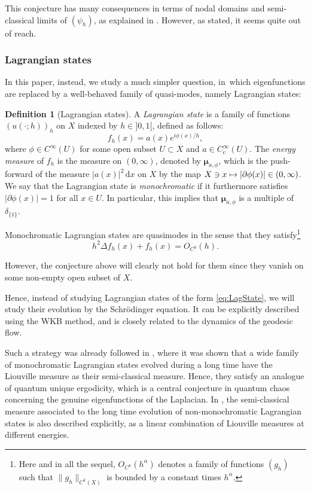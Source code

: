 \documentclass[JEP,XML,SOM,Unicode,published]{cedram}
\newcommand\mto{\mathchoice{\longmapsto}{\mapsto}{\mapsto}{\mapsto}}
\newcommand{\rc}{\mathrm{c}}
\newcommand{\rd}{\,\mathrm{d}}
\theoremstyle{plain}
\theoremstyle{definition}
\newtheorem{definition}[theorem]{Definition}
\begin{document}
This conjecture has many consequences in terms of nodal domains and semi-classical limits of $(\psi_h)$, as explained in \cite{LWL}. However, as stated, it seems quite out of reach.

\subsubsection*{Lagrangian states}

In this paper, instead, we study a much simpler question, in~which eigenfunctions are replaced by a well-behaved family of quasi-modes, namely Lagrangian states:

\begin{definition}[Lagrangian states]\label{def:LagStat}
A \emph{Lagrangian state} is a family of functions $(u(\cdot;h))_h$ on $X$ indexed by $h\in{}]0,1[$, defined as follows:\vspace{-3pt}
\begin{equation}\label{eq:LagState}
f_h(x)=a(x)e^{i\phi(x)/h},
\end{equation}
where $\phi\in C^\infty(U)$ for some open subset $U\subset X$ and $a\in C_\rc^\infty(U)$. The \emph{energy measure} of $f_h$ is the measure on $(0,\infty)$, denoted by $\boldsymbol{\mu}_{a,\phi}$, which is the push-forward of the measure $|a(x)|^2 \rd x$ on $X$ by the map $X\ni x \mto |\partial\phi(x)|\in (0,\infty)$. We say that the Lagrangian state is \emph{monochromatic} if it furthermore satisfies $|\partial \phi(x)|=1$ for all $x\in U$. In particular, this implies that $\boldsymbol{\mu}_{a,\phi}$ is a multiple of $\delta_{\{1\}}$.
\end{definition}

Monochromatic Lagrangian states are quasimodes in the sense that they satisfy\footnote{Here and in all the sequel, $O_{C^k}(h^\alpha)$ denotes a family of functions $(g_h)$ such that $\|g_h\|_{C^k(X)}$ is bounded by a constant times $h^\alpha$.}\vspace{-3pt}
\[
h^2\Delta f_h(x)+f_h(x)=O_{C^0}(h).
\]

However, the conjecture above will clearly not hold for them since they vanish on some non-empty open subset of $X$.

Hence, instead of studying Lagrangian states of the form \eqref{eq:LagState}, we will study their evolution by the Schrödinger equation. It can be explicitly described using the WKB method, and is closely related to the dynamics of the geodesic flow.

Such a strategy was already followed in \cite{Schu}, where it was shown that a wide family of monochromatic Lagrangian states evolved during a long time have the Liouville measure as their semi-classical measure. Hence, they satisfy an analogue of quantum unique ergodicity, which is a central conjecture in quantum chaos concerning the genuine eigenfunctions of the Laplacian. In \cite{Schu}, the semi-classical measure associated to the long time evolution of non-monochromatic Lagrangian states is also described explicitly, as a linear combination of Liouville measures at different energies.
\end{document}
